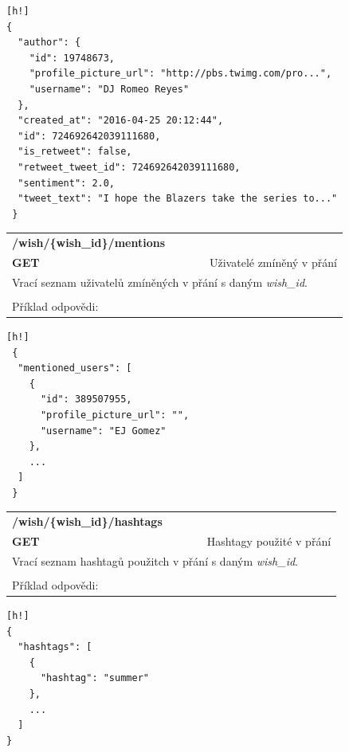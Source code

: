 \documentclass[thesis=B,czech]{FITthesis}[2012/06/26]
\begin{document}
\begin{lstlisting}[nolol=true][h!]
{
  "author": {
    "id": 19748673,
    "profile_picture_url": "http://pbs.twimg.com/pro...",
    "username": "DJ Romeo Reyes"
  },
  "created_at": "2016-04-25 20:12:44",
  "id": 724692642039111680,
  "is_retweet": false,
  "retweet_tweet_id": 724692642039111680,
  "sentiment": 2.0,
  "tweet_text": "I hope the Blazers take the series to..."
 }
\end{lstlisting} 

\begin{table}[h]
\begin{tabular}{llllr}
\rowcolor[HTML]{EFEFEF}
\large \textbf{/wish/\{wish\_id\}/mentions}        &         &                 &        & \multicolumn{1}{l}{}                \\
\rowcolor[HTML]{EFEFEF}
\textbf{GET}          &         &                 &        & Uživatelé zmíněný v přání                        \\
\multicolumn{5}{l}{\parbox[t]{12.8cm}{Vrací seznam uživatelů zmíněných v přání s daným \textit{wish\_id}.}  } \\    
 & & & & \\
 Příklad odpovědi:
\end{tabular}
\end{table}

\begin{lstlisting}[nolol=true][h!]
 {
  "mentioned_users": [
    {
      "id": 389507955,
      "profile_picture_url": "",
      "username": "EJ Gomez"
    },
    ...
  ]
 }
\end{lstlisting} 

\begin{table}[h]
\begin{tabular}{llllr}
\rowcolor[HTML]{EFEFEF}
\large \textbf{/wish/\{wish\_id\}/hashtags}        &         &                 &        & \multicolumn{1}{l}{}                \\
\rowcolor[HTML]{EFEFEF}
\textbf{GET}          &         &                 &        & Hashtagy použité v přání                        \\
\multicolumn{5}{l}{\parbox[t]{12.8cm}{Vrací seznam hashtagů použitch v přání s daným \textit{wish\_id}.}  } \\   
 & & & & \\
 Příklad odpovědi: 
\end{tabular}
\end{table}

\noindent\begin{minipage}{\textwidth}
\begin{lstlisting}[nolol=true][h!]
{
  "hashtags": [
    {
      "hashtag": "summer"
    },
    ...
  ]
}
\end{lstlisting} 
\end{minipage}
\end{document}
